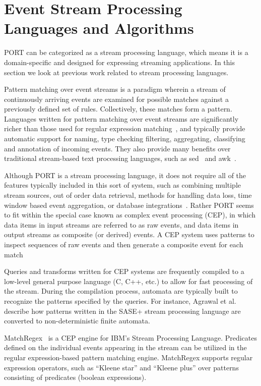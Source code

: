 \section{Event Stream Processing Languages and Algorithms}
PORT can be categorized as a stream processing language,
which means it is a domain-specific and
designed for expressing streaming applications.
In this section we look at previous work related to stream processing languages.

Pattern matching
over event streams is a paradigm
wherein a stream of continuously arriving events are examined for
possible matches against a previously defined set of rules. Collectively, these matches form a pattern.
Languages written for pattern matching over event
streams are significantly richer than those used for regular expression
matching~\cite{DBLP:conf/sigmod/AgrawalDGI08},
and typically provide automatic
support for naming, type checking filtering, aggregating, classifying and
annotation of incoming events. They also  provide many benefits over traditional
stream-based text processing languages, such as sed~\cite{Mcmahon1979sed} and
awk~\cite{DBLP:journals/spe/AhoKW79}.

Although PORT is a stream processing language, it does not
require all of the features typically
included in this sort of system, such as
combining multiple stream sources,
out of order data retrieval,
methods for handling data loss,
time window based event aggregation,
or database integrations~\cite{DBLP:journals/csur/DayarathnaP18}.
Rather PORT seems to fit within the special case
known as complex event processing (CEP),
in which data items in input streams are referred to as raw events, and data items in output streams
as composite (or derived) events. A CEP system uses patterns to inspect
sequences of raw events and then generate a composite event for each
match~\cite{DBLP:journals/ibmrd/HirzelAGJKKMNSSW13}

Queries and transforms written for CEP systems are
frequently compiled to a low-level general purpose language (C, C++, etc.) to allow for fast
processing of the stream. During the compilation process, automata are typically
built to recognize the patterns specified by the queries. For instance, Agrawal et
al.~\cite{DBLP:conf/sigmod/AgrawalDGI08} describe how patterns written in the SASE+ stream
processing language are converted to non-deterministic finite automata.

MatchRegex~\cite{DBLP:conf/debs/Hirzel12} is a CEP engine for IBM’s Stream Processing
Language. Predicates defined on the individual events appearing in the
stream can be utilized in the regular expression-based pattern matching
engine. MatchRegex supports regular expression operators, such as “Kleene star”
and “Kleene plus” over patterns consisting of predicates (boolean expressions).

